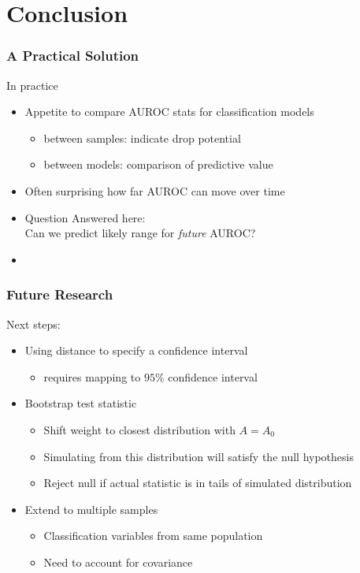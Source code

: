 \documentclass{beamer}
\begin{document}


\section{Conclusion}



\begin{frame}
\frametitle{A Practical Solution}

In practice
\begin{itemize}
    \item Appetite to compare AUROC stats for classification models
    \begin{itemize}
        \item between samples: indicate drop potential
        \item between models: comparison of predictive value
    \end{itemize}
    \item Often surprising how far AUROC can move over time
    \item Question Answered here: \\
        Can we predict likely range for \emph{future} AUROC?
    \item
\end{itemize}

\end{frame}


\begin{frame}
\frametitle{Future Research}

Next steps:
\begin{itemize}
    \item Using distance to specify a confidence interval
    \begin{itemize}
        \item requires mapping to $95\%$ confidence interval
    \end{itemize}
    \item Bootstrap test statistic
    \begin{itemize}
        \item Shift weight to closest distribution with $A = A_0$
        \item Simulating from this distribution will satisfy the null hypothesis
        \item Reject null if actual statistic is in tails of simulated distribution
    \end{itemize}
    \item Extend to multiple samples
    \begin{itemize}
        \item Classification variables from same population
        \item Need to account for covariance
    \end{itemize}
\end{itemize}

\end{frame}




\end{document}

